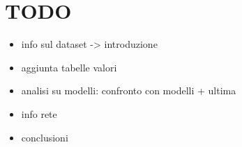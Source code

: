 \chapter{TODO}
\begin{itemize}
	\item info sul dataset -> introduzione
	\item aggiunta tabelle valori
	\item analisi su modelli: confronto con modelli + ultima
	
	\item info rete
	
	\item conclusioni
\end{itemize}
